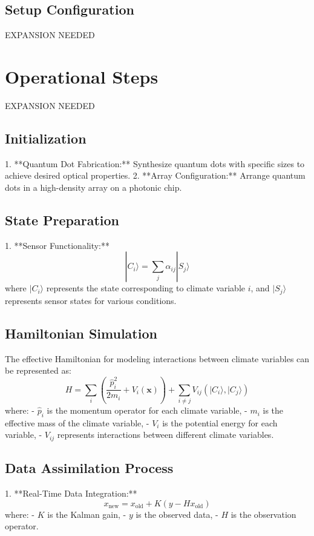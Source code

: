 \documentclass{article}
\begin{document}
\subsection{Setup Configuration}

EXPANSION NEEDED

\section{Operational Steps}

EXPANSION NEEDED

\subsection{Initialization}
1. **Quantum Dot Fabrication:** Synthesize quantum dots with specific sizes to achieve desired optical properties.
2. **Array Configuration:** Arrange quantum dots in a high-density array on a photonic chip.

\subsection{State Preparation}
1. **Sensor Functionality:**
   \[
   |C_i\rangle = \sum_{j} \alpha_{ij} |S_j\rangle
   \]
   where \(|C_i\rangle\) represents the state corresponding to climate variable \(i\), and \(|S_j\rangle\) represents sensor states for various conditions.

\subsection{Hamiltonian Simulation}
The effective Hamiltonian for modeling interactions between climate variables can be represented as:
\[
H = \sum_{i} \left( \frac{\hat{p}_i^2}{2m_i} + V_i(\mathbf{x}) \right) + \sum_{i \neq j} V_{ij}(|C_i\rangle, |C_j\rangle)
\]
where:
- \(\hat{p}_i\) is the momentum operator for each climate variable,
- \(m_i\) is the effective mass of the climate variable,
- \(V_i\) is the potential energy for each variable,
- \(V_{ij}\) represents interactions between different climate variables.

\subsection{Data Assimilation Process}
1. **Real-Time Data Integration:**
   \[
   x_{\text{new}} = x_{\text{old}} + K(y - Hx_{\text{old}})
   \]
   where:
   - \(K\) is the Kalman gain,
   - \(y\) is the observed data,
   - \(H\) is the observation operator.
\end{document}
